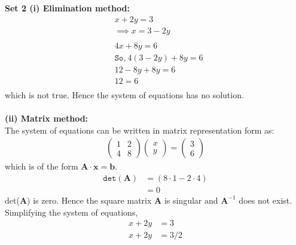 \documentclass[12pt,letterpaper,fleqn]{article}
\theoremstyle{definition}
\begin{document}
	\textbf{Set 2 (i) Elimination method:}
	\begin{equation*}
	\begin{split}
	&x + 2y = 3\\
	&\implies x = 3 -2y\\
	\\
	&4x + 8y = 6\\
	&\texttt{So,}~4(3- 2y) + 8y = 6\\
	&12 - 8y + 8y = 6\\
	&12 = 6 \\
	\end{split}
	\end{equation*}
	which is not true. Hence the system of equations has no solution.\\
	\\
	\textbf{ (ii) Matrix method:}\\
	The system of equations can be written in matrix representation form as:
	\begin{equation*}
	\begin{split}
	\begin{pmatrix}
	1 &2\\
	4 &8
	\end{pmatrix}
	\begin{pmatrix}
	x\\
	y
	\end{pmatrix} =
	\begin{pmatrix}
	3\\
	6
	\end{pmatrix}
	\end{split}
	\end{equation*}
	which is of the form $\textbf{A}\cdot \textbf{x} = \textbf{b}$.
	\begin{equation*}
	\begin{split}
	\texttt{det}(\textbf{A}) &= ( 8 \cdot 1 - 2 \cdot 4 )\\
	&= 0
	\end{split}
	\end{equation*}
	det(\textbf{A}) is zero. Hence the square matrix \textbf{A} is singular and $\textbf{A}^{-1}$ does not exist.\\
	Simplifying the system of equations,
	\begin{equation*}
	\begin{split}
	x + 2y &= 3\\
	x + 2y &= 3/2
	\end{split}
	\end{equation*}
\end{document}
